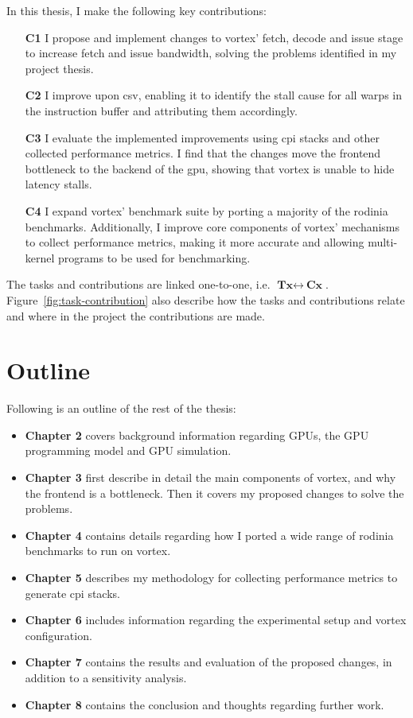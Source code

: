 In this thesis, I make the following key contributions:
\begin{itemize}
    \item[\textbf{C1}] I propose and implement changes to \Gls{vortex}' fetch, decode and issue stage to increase fetch and issue bandwidth, solving the problems identified in my project thesis.
    \item[\textbf{C2}] I improve upon \acrshort{csv}, enabling it to identify the stall cause for all warps in the instruction buffer and attributing them accordingly.
    \item[\textbf{C3}] I evaluate the implemented improvements using \acrshort{cpi} stacks and other collected performance metrics. I find that the changes move the frontend bottleneck to the backend of the \Gls{gpu}, showing that \Gls{vortex} is unable to hide latency stalls.
    \item[\textbf{C4}] I expand \Gls{vortex}' benchmark suite by porting a majority of the \Gls{rodinia} benchmarks. Additionally, I improve core components of \Gls{vortex}' mechanisms to collect performance metrics, making it more accurate and allowing multi-kernel programs to be used for benchmarking.  
\end{itemize}

The tasks and contributions are linked one-to-one, i.e. $\textbf{Tx}\leftrightarrow~\textbf{Cx}$. Figure~\ref{fig:task-contribution} also describe how the tasks and contributions relate and where in the project the contributions are made.

\section{Outline}

Following is an outline of the rest of the thesis:

\begin{itemize}
    \item \textbf{Chapter 2} covers background information regarding GPUs, the GPU programming model and GPU simulation.
    \item \textbf{Chapter 3} first describe in detail the main components of \Gls{vortex}, and why the frontend is a bottleneck. Then it covers my proposed changes to solve the problems.
    \item \textbf{Chapter 4} contains details regarding how I ported a wide range of \Gls{rodinia} benchmarks to run on \Gls{vortex}.
    \item \textbf{Chapter 5} describes my methodology for collecting performance metrics to generate \acrshort{cpi} stacks.
    \item \textbf{Chapter 6} includes information regarding the experimental setup and \Gls{vortex} configuration.
    \item \textbf{Chapter 7} contains the results and evaluation of the proposed changes, in addition to a sensitivity analysis.
    \item \textbf{Chapter 8} contains the conclusion and thoughts regarding further work.
\end{itemize}

